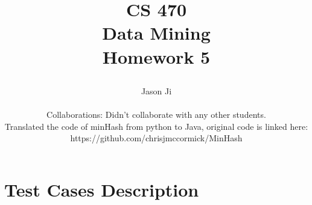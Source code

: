 \documentclass[9pt,twoside]{exam}
\begin{document}
\title{\begin{tcolorbox} \begin{center}{CS 470\\ 
\vspace{0.5cm}
Data Mining\\
\vspace{0.5cm}
Homework 5\\
 } \end{center}
 \end{tcolorbox}}
 \author{ 
 Jason Ji \\\\
Collaborations: Didn't collaborate with any other students.\\ Translated the code of minHash from python to Java, original code is linked here: \\https://github.com/chrisjmccormick/MinHash}
 \date{  }
 \maketitle
\pagestyle{myheadings}
\thispagestyle{plain}
\vspace{-0.5cm}







\newcommand{\bi}{\mathbf{i}}
\newcommand{\bbb}{\mathbf{b}}



\section*{Test Cases Description}
\end{document}
